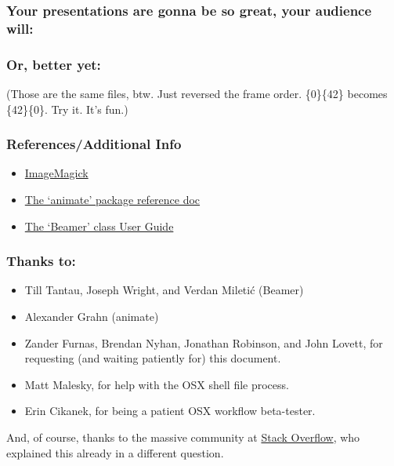 \documentclass{beamer}
\begin{document}
\begin{frame}
	\frametitle{Your presentations are gonna be so great, your audience will:}
	\begin{center}
	\end{center}
\end{frame}

\begin{frame}
	\frametitle{Or, better yet:}
	\begin{center}
	\end{center}
	\pause
(Those are the same files, btw. Just reversed the frame order. \{0\}\{42\} becomes \{42\}\{0\}. Try it. It's fun.)
\end{frame}

\begin{frame}
	\frametitle{References/Additional Info}
	
		\begin{itemize}
			\item \href{https://www.imagemagick.org/script/index.php}{ImageMagick} 
			\item \href{http://tug.ctan.org/macros/latex/contrib/animate/animate.pdf}{The `animate' package reference doc}
			\item \href{http://tug.ctan.org/macros/latex/contrib/beamer/doc/beameruserguide.pdf}{The `Beamer' class User Guide}
		\end{itemize}
	
\end{frame}

\begin{frame}
	\frametitle{Thanks to:}
	\begin{itemize}
		\item Till Tantau, Joseph Wright, and Verdan Mileti\'{c} (Beamer)
		\item Alexander Grahn (animate)
		\item Zander Furnas, Brendan Nyhan, Jonathan Robinson, and John Lovett, for requesting (and waiting patiently for) this document.
		\item Matt Malesky, for help with the OSX shell file process.
		\item Erin Cikanek, for being a patient OSX workflow beta-tester.
	\end{itemize}
	And, of course, thanks to the massive community at \href{http://stackoverflow.com/}{Stack Overflow}, who explained this already in a different question.
\end{frame}
\end{document}
